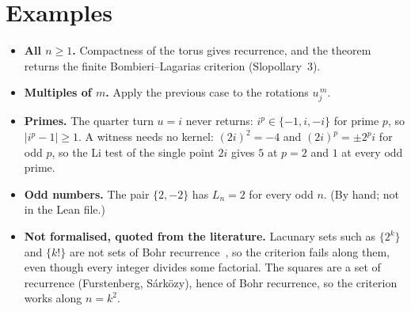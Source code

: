 \documentclass[11pt,a4paper]{article}
\theoremstyle{definition}\newtheorem*{definition}{Definition}
\theoremstyle{remark}\newtheorem*{remark}{Remark}
\begin{document}
\section{Examples}
\begin{itemize}[leftmargin=1.4em,itemsep=3pt]
\item \textbf{All $n\ge1$.} Compactness of the torus gives recurrence, and the theorem returns the
finite Bombieri--Lagarias criterion (Slopollary~3).
\item \textbf{Multiples of $m$.} Apply the previous case to the rotations $u_j^{\,m}$.
\item \textbf{Primes.} The quarter turn $u=i$ never returns: $i^p\in\{-1,i,-i\}$ for prime $p$, so
$|i^p-1|\ge1$. A witness needs no kernel: $(2i)^2=-4$ and $(2i)^p=\pm2^p i$ for odd $p$, so the
Li test of the single point $2i$ gives $5$ at $p=2$ and $1$ at every odd prime.
\item \textbf{Odd numbers.} The pair $\{2,-2\}$ has $L_n=2$ for every odd $n$. (By hand; not in
the Lean file.)
\item \textbf{Not formalised, quoted from the literature.} Lacunary sets such as $\{2^k\}$ and
$\{k!\}$ are not sets of Bohr recurrence~\cite{lac}, so the criterion fails along them, even though
every integer divides some factorial. The squares are a set of recurrence
(Furstenberg, S\'ark\"ozy), hence of Bohr recurrence, so the criterion works along $n=k^2$.
\end{itemize}
\end{document}
